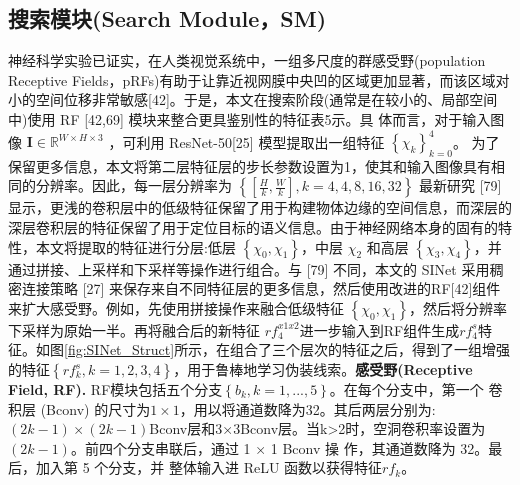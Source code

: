 \documentclass[final]{cvpr}
\renewcommand{\figref}[1]{图\ref{#1}}
\begin{document}
\subsection{搜索模块(Search Module，SM)}\label{sec:search_module}
神经科学实验已证实，在人类视觉系统中，一组多尺度的群感受野(population Receptive Fields，pRFs)有助于让靠近视网膜中央凹的区域更加显著，而该区域对小的空间位移非常敏感[42]。于是，本文在搜索阶段(通常是在较小的、局部空间中)使用 RF [42,69] 模块来整合更具鉴别性的特征表5示。具 体而言，对于输入图像 
$\mathbf{I} \in \mathbb{R}^{W\times H\times3 }$ %
，可利用 ResNet-50[25] 模型提取出一组特征
$\left \{ \chi_{k}  \right \}_{k=0}^{4}$。
为了保留更多信息，本文将第二层特征层的步长参数设置为1，使其和输入图像具有相同的分辨率。因此，每一层分辨率为
$\left \{ \left [  \frac{H}{k},\frac{W}{k}  \right ] , k=4,4,8,16,32\right \} $
最新研究 [79] 显示，更浅的卷积层中的低级特征保留了用于构建物体边缘的空间信息，而深层的深层卷积层的特征保留了用于定位目标的语义信息。由于神经网络本身的固有的特性，本文将提取的特征进行分层:低层 
$\left \{ \chi_{0},\chi_{1} \right \} $，中层 $\chi_{2}$ 和高层
$\left \{ \chi_{3},\chi_{4} \right \} $，并通过拼接、上采样和下采样等操作进行组合。与 [79] 不同，本文的 SINet 采用稠密连接策略 [27] 来保存来自不同特征层的更多信息，然后使用改进的RF[42]组件来扩大感受野。例如，先使用拼接操作来融合低级特征 
$\left \{ \chi_{0},\chi_{1} \right \} $，然后将分辨率下采样为原始一半。再将融合后的新特征
$rf_{4}^{x1x2} $进一步输入到RF组件生成$rf_{4}^{s}$特征。如\figref{fig:SINet_Struct}所示，在组合了三个层次的特征之后，得到了一组增强的特征$\left\{rf_{k}^{s},k=1,2,3,4\right\}$，用于鲁棒地学习伪装线索。\textbf{感受野(Receptive Field, RF). }RF模块包括五个分支$\left \{ b_{k} , k=1,...,5 \right \}$。在每个分支中，第一个 卷积层 (Bconv) 的尺寸为$1\times1$，用以将通道数降为32。其后两层分别为:$(2k-1)\times(2k-1)$Bconv层和3×3Bconv层。当k>2时，空洞卷积率设置为$(2k − 1)$。前四个分支串联后，通过 1 × 1 Bconv 操 作，其通道数降为 32。最后，加入第 5 个分支，并 整体输入进 ReLU 函数以获得特征$rf_{k}$。
\end{document}
